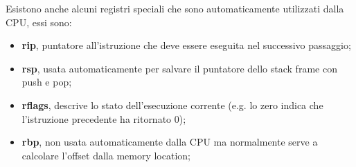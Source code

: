 Esistono anche alcuni registri speciali che sono automaticamente utilizzati dalla CPU, essi sono:
\begin{itemize}
    \item \textbf{rip}, puntatore all'istruzione che deve essere eseguita nel successivo passaggio;
    \item \textbf{rsp}, usata automaticamente per salvare il puntatore dello stack frame con push e pop;
    \item \textbf{rflags}, descrive lo stato dell'esecuzione corrente (e.g. lo zero indica che l'istruzione precedente ha ritornato 0);
    \item \textbf{rbp}, non usata automaticamente dalla CPU ma normalmente serve a calcolare l'offset dalla memory location;
\end{itemize}

